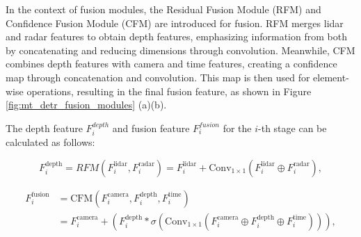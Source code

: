 \documentclass[report.tex]{subfiles}
\begin{document}
    In the context of fusion modules, the Residual Fusion Module (RFM) and Confidence Fusion Module (CFM) are introduced for fusion. RFM merges lidar and radar features to obtain depth features, emphasizing information from both by concatenating and reducing dimensions through convolution. Meanwhile, CFM combines depth features with camera and time features, creating a confidence map through concatenation and convolution. This map is then used for element-wise operations, resulting in the final fusion feature, as shown in Figure \ref{fig:mt_detr_fusion_modules} (a)(b).

    The depth feature $F_{i}^{depth}$ and fusion feature $F_{i}^{fusion}$ for the $i$-th stage can be calculated as follows:


    \begin{equation}
        F_{i}^{\text{depth}} = RFM(F_{i}^{\text{lidar}}, F_{i}^{\text{radar}}) = F_{i}^{\text{lidar}} + \text{Conv}_{1\times1}(F_{i}^{\text{lidar}} \oplus F_{i}^{\text{radar}}),
    \end{equation}


    \begin{equation}
        \begin{split}
            F_{i}^{\text{fusion}} &= \text{CFM}\left(F_{i}^{\text{camera}}, F_{i}^{\text{depth}}, F_{i}^{\text{time}}\right) \\
            &= F_{i}^{\text{camera}} + \left(F_{i}^{\text{depth}} * \sigma\left(\text{Conv}_{1\times1}\left(F_{i}^{\text{camera}} \oplus F_{i}^{\text{depth}} \oplus F_{i}^{\text{time}}\right)\right)\right),
        \end{split}
        \end{equation}
        

\end{document}
